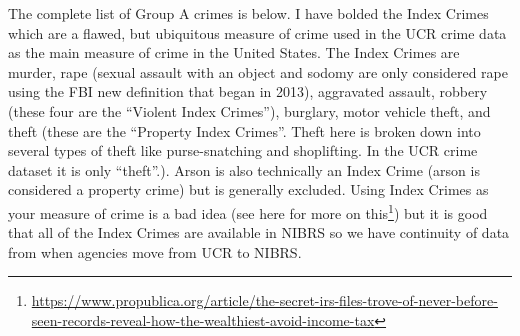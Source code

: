 \documentclass[
]{krantz}
\renewcommand{\href}[2]{#2\footnote{\url{#1}}}
\begin{document}
The complete list of Group A crimes is below. I have bolded
the Index Crimes which are a flawed, but ubiquitous measure
of crime used in the UCR crime data as the main measure of
crime in the United States. The Index Crimes are murder,
rape (sexual assault with an object and sodomy are only
considered rape using the FBI new definition that began in
2013), aggravated assault, robbery (these four are the
``Violent Index Crimes''), burglary, motor vehicle theft,
and theft (these are the ``Property Index Crimes''. Theft
here is broken down into several types of theft like
purse-snatching and shoplifting. In the UCR crime dataset it
is only ``theft''.). Arson is also technically an Index
Crime (arson is considered a property crime) but is
generally excluded. Using Index Crimes as your measure of
crime is a bad idea (see
\href{https://www.propublica.org/article/the-secret-irs-files-trove-of-never-before-seen-records-reveal-how-the-wealthiest-avoid-income-tax}{here
for more on this}) but it is good that all of the Index
Crimes are available in NIBRS so we have continuity of data
from when agencies move from UCR to NIBRS.
\end{document}
